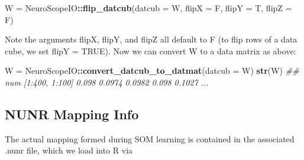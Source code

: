 \documentclass[]{article}
\newenvironment{Shaded}{\begin{snugshade}}{\end{snugshade}}
\newcommand{\CommentTok}[1]{\textcolor[rgb]{0.56,0.35,0.01}{\textit{#1}}}
\newcommand{\DataTypeTok}[1]{\textcolor[rgb]{0.13,0.29,0.53}{#1}}
\newcommand{\KeywordTok}[1]{\textcolor[rgb]{0.13,0.29,0.53}{\textbf{#1}}}
\newcommand{\NormalTok}[1]{#1}
\newcommand{\OperatorTok}[1]{\textcolor[rgb]{0.81,0.36,0.00}{\textbf{#1}}}
\newcommand{\StringTok}[1]{\textcolor[rgb]{0.31,0.60,0.02}{#1}}
\begin{document}
\begin{Shaded}
\begin{Highlighting}[]
\NormalTok{W =}\StringTok{ }\NormalTok{NeuroScopeIO}\OperatorTok{::}\KeywordTok{flip_datcub}\NormalTok{(}\DataTypeTok{datcub =}\NormalTok{ W, }\DataTypeTok{flipX =}\NormalTok{ F, }\DataTypeTok{flipY =}\NormalTok{ T, }\DataTypeTok{flipZ =}\NormalTok{ F)}
\end{Highlighting}
\end{Shaded}

Note the arguments flipX, flipY, and flipZ all default to F (to flip rows of a data cube, we set flipY = TRUE). Now we can convert W to a data matrix as above:

\begin{Shaded}
\begin{Highlighting}[]
\NormalTok{W =}\StringTok{ }\NormalTok{NeuroScopeIO}\OperatorTok{::}\KeywordTok{convert_datcub_to_datmat}\NormalTok{(}\DataTypeTok{datcub =}\NormalTok{ W)}
\KeywordTok{str}\NormalTok{(W)}
\CommentTok{##  num [1:400, 1:100] 0.098 0.0974 0.0982 0.098 0.1027 ...}
\end{Highlighting}
\end{Shaded}

\hypertarget{nunr-mapping-info}{%
\subsection{NUNR Mapping Info}\label{nunr-mapping-info}}

The actual mapping formed during SOM learning is contained in the associated .nunr file, which we load into R via

\begin{Shaded}
\end{Shaded}
\end{document}
